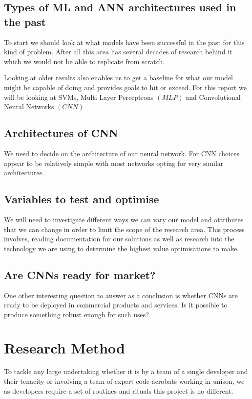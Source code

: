 \subsection{Types of ML and ANN architectures used in the past}
To start we should look at what models have been successful in the past for this kind of problem. After all this area has several decades of research behind it which we would not be able to replicate from scratch.

Looking at older results also enables us to get a baseline for what our model might be capable of doing and provides goals to hit or exceed. For this report we will be looking at SVMs, Multi Layer Perceptrons $\left(MLP\right)$ and Convolutional Neural Networks $\left(CNN\right)$

\subsection{Architectures of CNN}
We need to decide on the architecture of our neural network. For CNN choices appear to be relatively simple with most networks opting for very similar architectures.

\subsection{Variables to test and optimise}
We will need to investigate different ways we can vary our model and attributes that we can change in order to limit the scope of the research area. This process involves, reading documentation for our solutions as well as research into the technology we are using to determine the highest value optimisations to make.

\subsection{Are CNNs ready for market?}
One other interesting question to answer as a conclusion is whether CNNs are ready to be deployed in commercial products and services. Is it possible to produce something robust enough for such uses?

\section{Research Method}
To tackle any large undertaking whether it is by a team of a single developer and their tenacity or involving a team of expert code acrobats working in unison, we as developers require a set of routines and rituals this project is no different.

